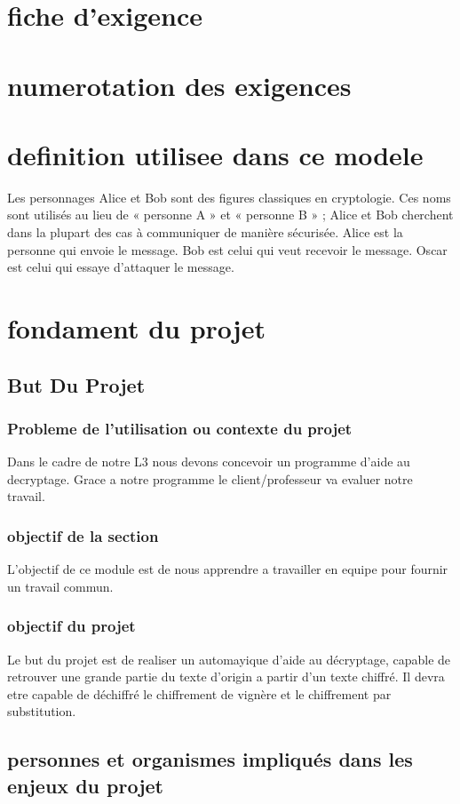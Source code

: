 \documentclass[a4]{article}
\begin{document}
		\section{fiche d'exigence}
		\section{numerotation des exigences}
		\section{definition utilisee dans ce modele}
			Les personnages Alice et Bob sont des figures classiques en cryptologie. Ces noms sont utilisés au lieu de « personne A » et « personne B » ; Alice et Bob cherchent dans la plupart des cas à communiquer de manière sécurisée.
			Alice est la personne qui envoie le message.
			Bob est celui qui veut recevoir le message.
			Oscar est celui qui essaye d'attaquer le message.
	\section{fondament du projet}
		\subsection{But Du Projet} 
			\subsubsection{Probleme de l'utilisation ou contexte du projet}
				Dans le cadre de notre L3 nous devons concevoir un programme d'aide au decryptage.
				Grace a notre programme le client/professeur va evaluer notre travail.
			\subsubsection{objectif de la section}
				L'objectif de ce module est de nous apprendre a travailler en equipe pour fournir un travail commun.
			\subsubsection{objectif du projet}
				Le but du projet est de realiser un automayique d'aide au décryptage, capable de retrouver une grande partie du texte d'origin a partir d'un texte chiffré. Il devra etre capable de déchiffré le chiffrement de vignère et le chiffrement par substitution.
		\subsection{personnes et organismes impliqués dans les enjeux du projet} 
\end{document}
